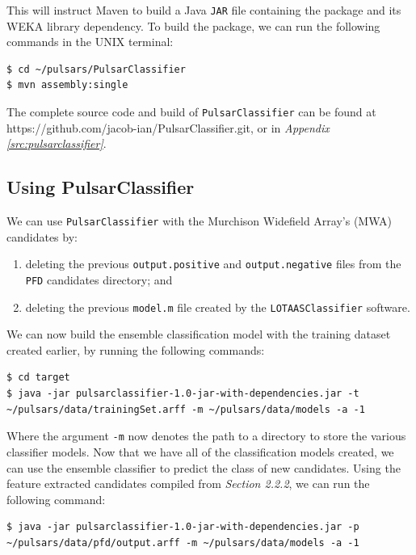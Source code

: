 \documentclass{article}
\begin{document}
\begin{appendices}
\begin{subappendices}
This will instruct Maven to build a Java \verb|JAR| file containing the package and its WEKA library dependency. To build the package, we can run the following commands in the UNIX terminal:

\begin{lstlisting}[numbers=none]
$ cd ~/pulsars/PulsarClassifier
$ mvn assembly:single
\end{lstlisting}

The complete source code and build of \verb|PulsarClassifier| can be found at https://github.com/jacob-ian/PulsarClassifier.git, or in \emph{Appendix \ref{src:pulsarclassifier}}.

\subsection{Using PulsarClassifier}
\label{apndx:usepulsarclassifier}

We can use \verb|PulsarClassifier| with the Murchison Widefield Array's (MWA) candidates by:
\begin{enumerate}[label=\roman*.] 
    \item deleting the previous \verb|output.positive| and \verb|output.negative| files from the \verb|PFD| candidates directory; and
    \item deleting the previous \verb|model.m| file created by the \verb|LOTAASClassifier| software.
\end{enumerate}

We can now build the ensemble classification model with the training dataset created earlier, by running the following commands:

\begin{lstlisting}[numbers=none]
$ cd target
$ java -jar pulsarclassifier-1.0-jar-with-dependencies.jar -t ~/pulsars/data/trainingSet.arff -m ~/pulsars/data/models -a -1
\end{lstlisting}

Where the argument \verb|-m| now denotes the path to a directory to store the various classifier models. Now that we have all of the classification models created, we can use the ensemble classifier to predict the class of new candidates. Using the feature extracted candidates compiled from \emph{Section 2.2.2}, we can run the following command:

\begin{lstlisting}[numbers=none]
$ java -jar pulsarclassifier-1.0-jar-with-dependencies.jar -p ~/pulsars/data/pfd/output.arff -m ~/pulsars/data/models -a -1
\end{lstlisting}


\end{subappendices}
\end{appendices}
\end{document}
